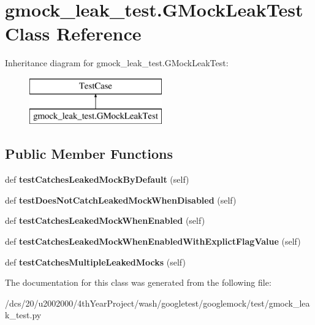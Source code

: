 \hypertarget{classgmock__leak__test_1_1GMockLeakTest}{}\section{gmock\+\_\+leak\+\_\+test.\+G\+Mock\+Leak\+Test Class Reference}
\label{classgmock__leak__test_1_1GMockLeakTest}
Inheritance diagram for gmock\+\_\+leak\+\_\+test.\+G\+Mock\+Leak\+Test\+:\begin{figure}[H]
\begin{center}
\leavevmode
\includegraphics[height=2.000000cm]{classgmock__leak__test_1_1GMockLeakTest}
\end{center}
\end{figure}
\subsection*{Public Member Functions}
\begin{DoxyCompactItemize}
\item 
\mbox{\label{classgmock__leak__test_1_1GMockLeakTest_ad87d271de7b3f106e51272d6e9139c76}} 
def {\bfseries test\+Catches\+Leaked\+Mock\+By\+Default} (self)
\item 
\mbox{\label{classgmock__leak__test_1_1GMockLeakTest_a3107bf5a603558ab2d97d88fb5589951}} 
def {\bfseries test\+Does\+Not\+Catch\+Leaked\+Mock\+When\+Disabled} (self)
\item 
\mbox{\label{classgmock__leak__test_1_1GMockLeakTest_a78f4040a392d183597f71d92da8c1246}} 
def {\bfseries test\+Catches\+Leaked\+Mock\+When\+Enabled} (self)
\item 
\mbox{\label{classgmock__leak__test_1_1GMockLeakTest_ab19cf302ea06e1b186bd6ab951d9161e}} 
def {\bfseries test\+Catches\+Leaked\+Mock\+When\+Enabled\+With\+Explict\+Flag\+Value} (self)
\item 
\mbox{\label{classgmock__leak__test_1_1GMockLeakTest_a09465b2bfde98834e4bb9563c035f034}} 
def {\bfseries test\+Catches\+Multiple\+Leaked\+Mocks} (self)
\end{DoxyCompactItemize}


The documentation for this class was generated from the following file\+:\begin{DoxyCompactItemize}
\item 
/dcs/20/u2002000/4th\+Year\+Project/wash/googletest/googlemock/test/gmock\+\_\+leak\+\_\+test.\+py\end{DoxyCompactItemize}
